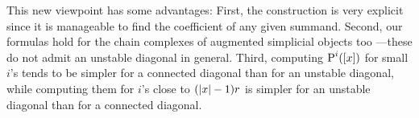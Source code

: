 This new viewpoint has some advantages:
First, the construction is very explicit since it is manageable to find the coefficient of any given summand.
Second, our formulas hold for the chain complexes of augmented simplicial objects too ---these do not admit an unstable diagonal in general.
Third, computing $\operatorname{P}^i([x])$ for small $i$'s tends to be simpler for a connected diagonal than for an unstable diagonal, while computing them for $i$'s close to $(\lvert x\rvert-1)r$ is simpler for an unstable diagonal than for a connected diagonal.


